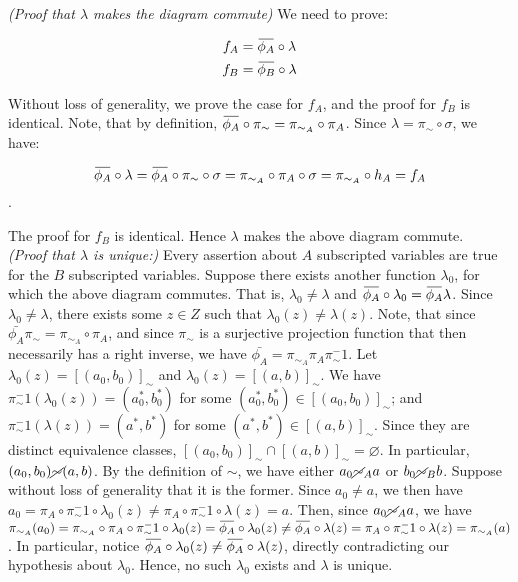 \documentclass[11pt,a4paper]{article}
\newcommand{\overbar}[1]{\mkern 1.5mu\overline{\mkern-1.5mu#1\mkern-1.5mu}\mkern 1.5mu}
\begin{document}
\noindent \textit{(Proof that $\lambda$ makes the diagram commute)} We need to prove: 

\begin{align*}
f_A &= \overbar{\phi_A} \circ \lambda \\
f_B &= \overbar{\phi_B} \circ \lambda
\end{align*}

\noindent Without loss of generality, we prove the case for $f_A$, and the proof for $f_B$ is identical.  Note, that by definition, $\overbar{\phi_A} \circ \pi_{\sim} = \pi_{\sim_A} \circ \pi_A$.  Since $\lambda  = \pi_{\sim} \circ \sigma$, we have:

$$\overbar{\phi_A} \circ \lambda = \overbar{\phi_A} \circ \pi_{\sim} \circ \sigma = \pi_{\sim_A} \circ \pi_A \circ \sigma = \pi_{\sim_A} \circ h_A = f_A$$.

\noindent  The proof for $f_B$ is identical.  Hence $\lambda$ makes the above diagram commute. \\

\noindent \textit{(Proof that $\lambda$ is unique:)} Every assertion about $A$ subscripted variables are true for the $B$ subscripted variables. Suppose there exists another function $\lambda_0$, for which the above diagram commutes.  That is, $\lambda_0 \neq \lambda$ and $\overbar{\phi_A} \circ \lambda_0 = \overbar{\phi_A} \lambda$.  Since $\lambda_0 \neq \lambda$, there exists some $z \in Z$ such that $\lambda_0(z) \neq \lambda(z)$.  Note, that since $\bar{\phi_A} \pi_{\sim} = \pi_{\sim_A} \circ \pi_A$, and since $\pi_{\sim}$ is a surjective projection function that then necessarily has a right inverse, we have $\bar{\phi_A} = \pi_{\sim_A}\pi_A\pi_{\sim}^-1$.  Let $\lambda_0(z) = [(a_0,b_0)]_{\sim}$ and $\lambda_0(z) = [(a,b)]_{\sim}$. We have $\pi_{\sim}^-1(\lambda_0(z)) = (a_0^*, b_0^*)$ for some $(a_0^*, b_0^*) \in [(a_0,b_0)]_{\sim}$; and $\pi_{\sim}^-1(\lambda(z)) = (a^*, b^*)$ for some $(a^*, b^*) \in [(a,b)]_{\sim}$.  Since they are distinct equivalence classes, $[(a_0,b_0)]_{\sim} \cap [(a,b)]_{\sim} = \varnothing$.  In particular, $(a_0, b_0) \cancel{\sim} (a,b)$.  By the definition of $\sim$, we have either $a_0 \cancel{\sim}_A a$ or $b_0 \cancel{\sim}_B b$.  Suppose without loss of generality that it is the former. Since $a_0 \neq a$, we then have $a_0 = \pi_A \circ \pi_{\sim}^-1 \circ \lambda_0(z) \neq \pi_A \circ \pi_{\sim}^-1 \circ \lambda(z) = a$.  Then, since $a_0 \cancel{\sim}_A a$, we have $\pi_{\sim_A}(a_0) = \pi_{\sim_A} \circ \pi_A \circ \pi_{\sim}^-1 \circ \lambda_0(z) = \overbar{\phi_A} \circ \lambda_0(z)  \neq \overbar{\phi_A} \circ \lambda(z) = \pi_A \circ \pi_{\sim}^-1 \circ \lambda(z) = \pi_{\sim_A}(a)$.  In particular, notice $\overbar{\phi_A} \circ \lambda_0(z)  \neq \overbar{\phi_A} \circ \lambda(z)$, directly contradicting our hypothesis about $\lambda_0$.  Hence, no such $\lambda_0$ exists and $\lambda$ is unique.  \\
\end{document}
